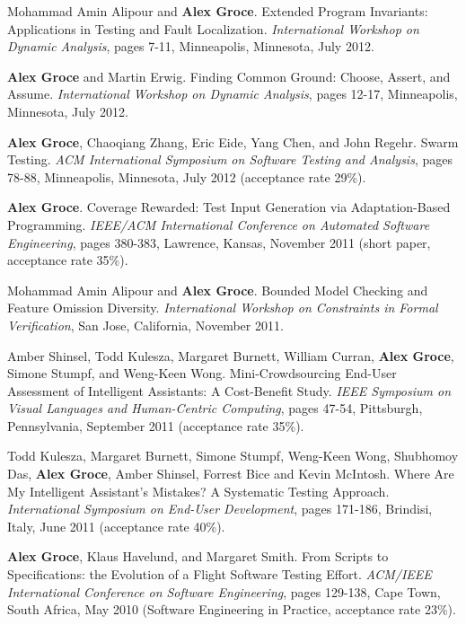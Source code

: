 \documentclass[ComputerScience]{vita}
\begin{document}
\begin{vita}
\begin{Refereed Conference and Workshop Publications}
\item Mohammad Amin Alipour and {\bf Alex Groce}.
\newblock Extended Program Invariants: Applications in Testing and Fault Localization.
\newblock \emph{International Workshop on Dynamic Analysis}, pages 7-11, Minneapolis, Minnesota, July 2012.

\item {\bf Alex Groce} and Martin Erwig.
\newblock Finding Common Ground: Choose, Assert, and Assume.
\newblock \emph{International Workshop on Dynamic Analysis}, pages 12-17, Minneapolis, Minnesota, July 2012.

\item {\bf Alex Groce}, Chaoqiang Zhang, Eric Eide, Yang Chen, and John Regehr.
\newblock Swarm Testing.
\newblock \emph{ACM International Symposium on Software Testing and Analysis}, pages 78-88, Minneapolis, Minnesota, July 2012 (acceptance rate 29\%).

\item {\bf Alex Groce}.
\newblock Coverage Rewarded: Test Input Generation via Adaptation-Based Programming.
\newblock \emph{IEEE/ACM International Conference on Automated Software Engineering}, pages 380-383, Lawrence, Kansas, November 2011 (short paper, acceptance rate 35\%).

\item
Mohammad Amin Alipour and {\bf Alex Groce}.
\newblock Bounded Model Checking and Feature Omission Diversity.
\newblock \emph{International Workshop on Constraints in Formal Verification}, San Jose, California, November 2011.

\item
Amber Shinsel, Todd Kulesza, Margaret Burnett, William Curran, {\bf Alex Groce}, Simone Stumpf, and Weng-Keen Wong.
\newblock Mini-Crowdsourcing End-User Assessment of Intelligent Assistants: A Cost-Benefit Study.
\newblock \emph{IEEE Symposium on Visual Languages and Human-Centric Computing}, pages 47-54, Pittsburgh, Pennsylvania, September 2011 (acceptance rate 35\%).

\item
Todd Kulesza, Margaret Burnett, Simone Stumpf, Weng-Keen Wong, Shubhomoy Das, {\bf Alex Groce}, Amber Shinsel, Forrest Bice and Kevin McIntosh.
\newblock Where Are My Intelligent Assistant's Mistakes?  A Systematic Testing Approach.
\newblock \emph{International Symposium on End-User Development}, pages 171-186, Brindisi, Italy, June 2011 (acceptance rate 40\%).

\item
{\bf Alex Groce}, Klaus Havelund, and Margaret Smith.
\newblock From Scripts to Specifications: the Evolution of a Flight Software Testing Effort.
\newblock \emph{ACM/IEEE International Conference on Software Engineering}, pages 129-138, Cape Town, South Africa, May 2010 (Software Engineering in Practice, acceptance rate 23\%). 


\end{Refereed Conference and Workshop Publications}
\end{vita}
\end{document}
